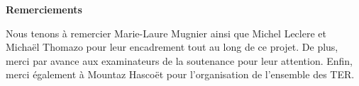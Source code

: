 
\thispagestyle{empty}
{\centering \Huge \bfseries Remerciements \par{}}
\begin{spacing}{1.5}

Nous tenons à remercier Marie-Laure Mugnier ainsi que Michel Leclere et Michaël Thomazo
pour leur encadrement tout au long de ce projet.
De plus, merci par avance aux examinateurs de la soutenance pour leur attention.
Enfin, merci également à Mountaz Hascoët pour l'organisation de l'ensemble des TER.

\end{spacing}



